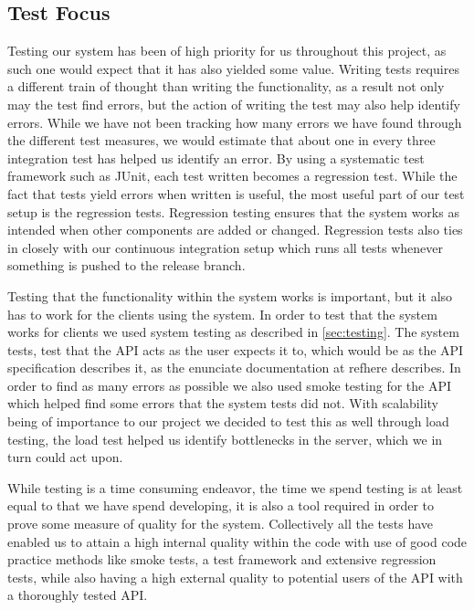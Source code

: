 \subsection{Test Focus}
Testing our system has been of high priority for us throughout this project, as such one would expect that it has also yielded some value.
Writing tests requires a different train of thought than writing the functionality, as a result not only may the test find errors, but the action of writing the test may also help identify errors.
While we have not been tracking how many errors we have found through the different test measures, we would estimate that about one in every three integration test has helped us identify an error.
By using a systematic test framework such as JUnit, each test written becomes a regression test.
While the fact that tests yield errors when written is useful, the most useful part of our test setup is the regression tests.
Regression testing ensures that the system works as intended when other components are added or changed.
Regression tests also ties in closely with our continuous integration setup which runs all tests whenever something is pushed to the release branch.

\bigskip
Testing that the functionality within the system works is important, but it also has to work for the clients using the system.
In order to test that the system works for clients we used system testing as described in \cref{sec:testing}.
The system tests, test that the API acts as the user expects it to, which would be as the API specification describes it, as the enunciate documentation at refhere describes.
In order to find as many errors as possible we also used smoke testing for the API which helped find some errors that the system tests did not.
With scalability being of importance to our project we decided to test this as well through load testing, the load test helped us identify bottlenecks in the server, which we in turn could act upon.

While testing is a time consuming endeavor, the time we spend testing is at least equal to that we have spend developing, it is also a tool required in order to prove some measure of quality for the system.
Collectively all the tests have enabled us to attain a high internal quality within the code with use of good code practice methods like smoke tests, a test framework and extensive regression tests, while also having a high external quality to potential users of the API with a thoroughly tested API.


